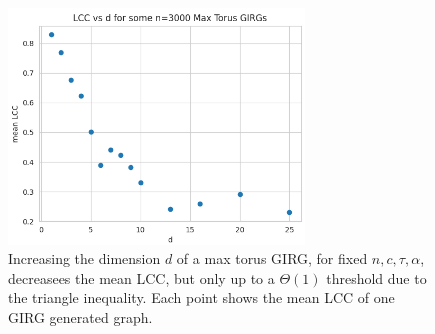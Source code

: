 \begin{figure}
    \centering
    \includegraphics[width=0.7\textwidth]{./figures/LCC_vs_d.png}
    \caption{Increasing the dimension $d$ of a max torus GIRG, for fixed $n, c, \tau, \alpha$, decreasees the mean LCC, but only up to a $\Theta(1)$ threshold due to the triangle inequality. Each point shows the mean LCC of one GIRG generated graph.}
    \label{fig:LCC_vs_d}
\end{figure}






